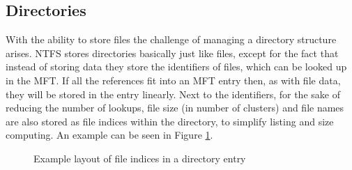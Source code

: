 \subsection{Directories}
With the ability to store files the challenge of managing a directory structure arises. NTFS stores directories basically just like files, except for the fact that instead of storing data they store the identifiers of files, which can be looked up in the MFT. If all the references fit into an MFT entry then, as with file data, they will be stored in the entry linearly. Next to the identifiers, for the sake of reducing the number of lookups, file size (in number of clusters) and file names are also stored as file indices within the directory, to simplify listing and size computing. An example can be seen in Figure \ref{fig:extent_file_indicies}.
\begin{figure}[h]
	\centering
	\caption{Example layout of file indices in a directory entry\label{fig:extent_file_indicies}}
\end{figure}
